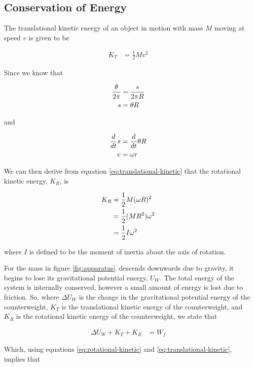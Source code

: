\documentclass[coverpage]{article}
\begin{document}
	\subsection{Conservation of Energy}
	
	The translational kinetic energy of an object in motion with mass $M$ moving at speed $v$ is given to be
	
	\begin{align}
		K_T&=\frac{1}{2}Mv^2 \label{eq:translational-kinetic}
	\end{align}

	Since we know that
	
	\begin{align}
		\frac{\theta}{2\pi}&=\frac{s}{2\pi R} \notag \\
		s&=\theta R
	\end{align}

	and 
	
	\begin{align}
		\frac{d}{dt}s&=\frac{d}{dt}\theta R \notag \\
		v&=\omega r \label{eq:omega-v-relationship}
	\end{align}

	We can then derive from equation \ref{eq:translational-kinetic} that the rotational kinetic energy, $K_R$, is
	
	\begin{align}
		K_R&=\frac{1}{2}M(\omega R)^2 \notag \\
		&=\frac{1}{2} (M R^2) \omega^2 \notag \\
		&=\frac{1}{2} I \omega^2 \label{eq:rotational-kinetic}
	\end{align}

	where $I$ is defined to be the moment of inertia about the axis of rotation.
	
	For the mass in figure \ref{fig:apparatus}~descends downwards due to gravity, it begins to lose its gravitational potential energy, $U_W$. The total energy of the system is internally conserved, however a small amount of energy is lost due to friction. So, where $\Delta{U}_W$ is the change in the gravitational potential energy of the counterweight, $K_T$ is the translational kinetic energy of the counterweight, and $K_R$ is the rotational kinetic energy of the counterweight, we state that
	
	\begin{align}
		\Delta{U}_W + K_T + K_R&=W_f
	\end{align}

	Which, using equations \ref{eq:rotational-kinetic} and \ref{eq:translational-kinetic}, implies that
	
\end{document}
